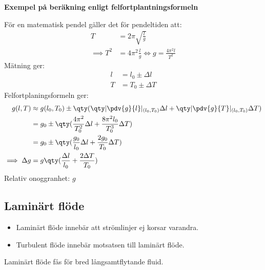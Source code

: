 \begin{ber}
	\textbf{Exempel på beräkning enligt felfortplantningsformeln}

	För en matematisk pendel gäller det för pendeltiden att:
	\begin{align*}
		T&=2\pi\sqrt{\frac{l}{g}}\\
		\implies T^2&=4\pi^2\frac{l}{g}\iff g=\frac{4\pi^2l}{T^2}
	\end{align*}
	Mätning ger:
	\begin{align*}
		l&=l_0\pm\Delta l\\
		T&=T_0\pm\Delta T
	\end{align*}
	Felfortplaningsformeln ger:
	\begin{align*}
		g(l,T)&\approx g(l_0,T_0)\pm\qty(\qty|\pdv{g}{l}|_{(l_0,T_0)}\Delta l+\qty|\pdv{g}{T}|_{(l_0,T_0)}\Delta T)\\
		&=g_0\pm\qty(\frac{4\pi^2}{T_0^2}\Delta l+\frac{8\pi^2l_0}{T_0^3}\Delta T)\\
		&=g_0\pm\qty(\frac{g_0}{l_0}\Delta l+\frac{2g_0}{T_0}\Delta T)\\
		\implies\Delta g&=g\qty(\frac{\Delta l}{l_0}+\frac{2\Delta T}{T_0})
	\end{align*}
	Relativ onoggranhet: $g$
\end{ber}

\subsection{Laminärt flöde}
\begin{itemize}
	\item Laminärt flöde innebär att strömlinjer ej korsar varandra.
	\item Turbulent flöde innebär motsatsen till laminärt flöde.
\end{itemize}
Laminärt flöde fås för bred långsamtflytande fluid.